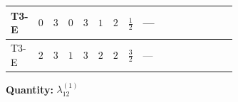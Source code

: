 \documentclass[8pt]{article}
\begin{document}
\begin{landscape}
\begin{longtable}{@{}llcccccc >{\raggedright\arraybackslash}p{0.21\linewidth} >{\raggedright\arraybackslash}p{0.21\linewidth} >{\raggedright\arraybackslash}p{0.21\linewidth}@{}}
\midrule
T3-E & $0$ & $3$ & $0$ & $3$ & $1$ & $2$ & $\frac{1}{2}$ & --- & \scriptsize\adjustbox{max width=\linewidth}{$\begin{gathered} {\lambda_{12}^{(1)}} \left(2 T_{\nu}^{(1)}+2 T_{\nu}^{(2)}+\frac{16 {\lambda_{12}^{(\times)}}}{3}+4 {\lambda_{S_1}^{(A)}}+4 {\lambda_{S_2}^{(A)}}\right)\end{gathered}$} & \scriptsize\adjustbox{max width=\linewidth}{$\begin{gathered} +{\lambda_{12}^{(\times)}} \left(\frac{4}{3} T_{\nu}^{(1)}+\frac{4}{3} T_{\nu}^{(2)}\right)\end{gathered}$} \\
\midrule
T3-E & $2$ & $3$ & $1$ & $3$ & $2$ & $2$ & $\frac{3}{2}$ & --- & \scriptsize\adjustbox{max width=\linewidth}{$\begin{gathered} {\lambda_{12}^{(1)}} \left(2 T_{\nu}^{(1)}+2 T_{\nu}^{(2)}+\frac{16 {\lambda_{12}^{(\times)}}}{3}+4 {\lambda_{S_1}^{(A)}}+4 {\lambda_{S_2}^{(A)}}\right)\end{gathered}$} & \scriptsize\adjustbox{max width=\linewidth}{$\begin{gathered} +{\lambda_{12}^{(\times)}} \left(\frac{4}{3} T_{\nu}^{(1)}+\frac{4}{3} T_{\nu}^{(2)}\right)\end{gathered}$} \\
\midrule
\bottomrule
\end{longtable}
\clearpage
\noindent\textbf{Quantity: }$\lambda_{12}^{(1)}$\par\smallskip

\end{landscape}
\end{document}
